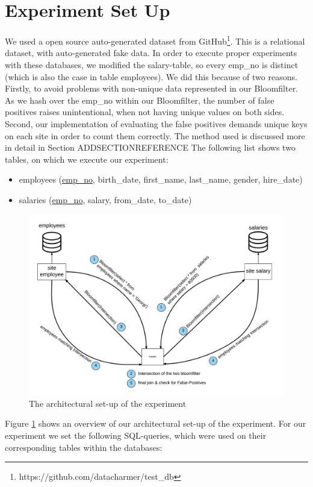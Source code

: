 \documentclass[12]{scrartcl}
\begin{document}
\section{Experiment Set Up}
We used a open source auto-generated dataset from GitHub\footnote{https://github.com/datacharmer/test\_db}. This is a relational dataset, with auto-generated fake data. In order to execute proper experiments with these databases, we modified the salary-table, so every emp_no is distinct (which is also the case in table employees). We did this because of two reasons. Firstly, to avoid problems with non-unique data represented in our Bloomfilter. As we hash over the emp_no within our Bloomfilter, the number of false positives raises unintentional, when not having unique values on both sides. Second, our implementation of evaluating the false positives demands unique keys on each site in order to count them correctly. The method used is discussed more in detail in Section ADDSECTIONREFERENCE The following list shows two tables, on which we execute our experiment: 
\begin{itemize}
	\item employees (\uline{emp\_no}, birth\_date, first\_name, last\_name, gender, hire\_date)
	\item salaries (\uline{emp\_no}, salary, from\_date, to\_date)
\end{itemize}



\begin{figure}[H]
	\begin{center}
		\includegraphics[scale=0.1]{res/architecture.png}
	\end{center}
	\caption{The architectural set-up of the experiment}
	\label{fig:architecture}
\end{figure}
Figure \ref{fig:architecture} shows an overview of our architectural set-up of the experiment. For our experiment we set the following SQL-queries, which were used on their corresponding tables within the databases:
\end{document}
